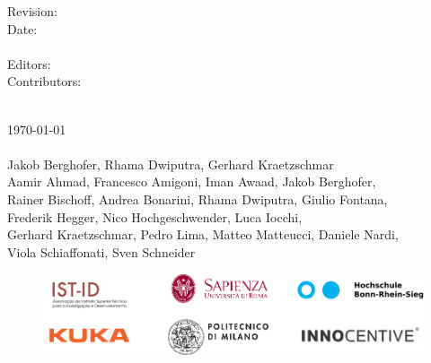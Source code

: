 \vfill
\noindent
\begin{minipage}[t]{0.18\textwidth}
\flushleft
	Revision:\\
	Date:\\
	\mbox{~}\\
	Editors:\\
	Contributors:\\
\end{minipage}%
\hspace*{3mm}
\begin{minipage}[t]{0.8\textwidth}
\flushleft
	\revisionNumber\\
	\today\\
	\mbox{~}\\
	Jakob Berghofer, Rhama Dwiputra, Gerhard Kraetzschmar\\
	Aamir Ahmad, Francesco Amigoni, Iman Awaad, 
	Jakob Berghofer,\\ 
	Rainer Bischoff, Andrea Bonarini, Rhama Dwiputra, Giulio Fontana, \\
	Frederik Hegger, Nico Hochgeschwender, Luca Iocchi, \\
	Gerhard Kraetzschmar, Pedro Lima, Matteo Matteucci, Daniele Nardi, \\
	Viola Schiaffonati, Sven Schneider
\end{minipage}
\hfill

\vfill
\vspace*{-10mm}
\begin{figure}[b]
	\centering
	\includegraphics[height=\institutionLogoHeight]{./fig/logos/consortiumLogo.pdf}
\end{figure}

\restoregeometry
